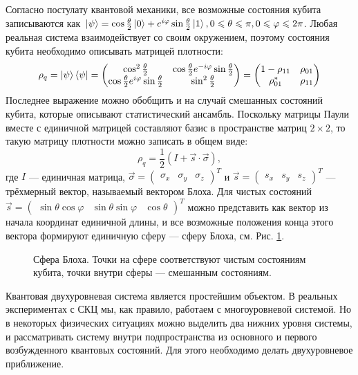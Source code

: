 Согласно постулату квантовой механики, все возможные состояния кубита записываются как~$\ket{\psi}=\cos\frac{\theta}{2}\ket{0}+ 
e^{i\varphi}\sin\frac{\theta}{2}\ket{1}, 0 \leqslant \theta \leqslant \pi, 0 \leqslant \varphi \leqslant 2\pi $. Любая реальная система взаимодействует со своим окружением, поэтому состояния кубита необходимо описывать матрицей плотности:
\begin{equation}
\rho_q = \ket{\psi}\bra{\psi} =
\begin{pmatrix} \cos^2\frac{\theta}{2} & \cos\frac{\theta}{2}e^{-i\varphi}\sin\frac{\theta}{2}\\
\cos\frac{\theta}{2}e^{i\varphi}\sin\frac{\theta}{2}& \sin^2\frac{\theta}{2}
\end{pmatrix} = 
\begin{pmatrix} 1-\rho_{11} & \rho_{01}\\ \rho_{01}^*& \rho_{11}
\end{pmatrix}
\end{equation}
Последнее выражение можно обобщить и на случай смешанных состояний кубита, которые описывают статистический ансамбль. Поскольку матрицы Паули вместе с единичной матрицей составляют базис в пространстве матриц $2\times2$, то такую матрицу плотности можно записать в общем виде:
\begin{equation}
\rho_q = \frac{1}{2}(I+\vec{s}\cdot\vec{\sigma}),
\label{eq: rho_to_bloch}
\end{equation}
где $I$ --- единичная матрица, $\vec{\sigma}=\begin{pmatrix} \sigma_x & \sigma_y & \sigma_z \end{pmatrix}^{T}$ и
 $\vec{s}=\begin{pmatrix} s_x & s_y & s_z \end{pmatrix}^{T}$ --- трёхмерный вектор, называемый вектором Блоха. Для чистых состояний $\vec{s}=\begin{pmatrix} \sin\theta\cos\varphi & \sin\theta\sin\varphi & \cos\theta \end{pmatrix}^{T}$ можно представить как вектор из начала координат единичной длины, и все возможные положения конца этого вектора формируют единичную сферу --- сферу Блоха, см. Рис. \ref{img:bloch}.
\begin{figure}
 	\centering
 	\def\svgwidth{4in}
 	
 	\caption{Сфера Блоха. Точки на сфере соответствуют чистым состояниям кубита, точки внутри сферы --- смешанным состояниям.}
 	\label{img:bloch}
\end{figure} 

Квантовая двухуровневая система является простейшим объектом. В реальных экспериментах с СКЦ мы, как правило, работаем с многоуровневой системой. Но в некоторых физических ситуациях можно выделить два нижних уровня системы, и рассматривать систему внутри подпространства из основного и первого возбужденного квантовых состояний. 
Для этого необходимо делать двухуровневое приближение. 

